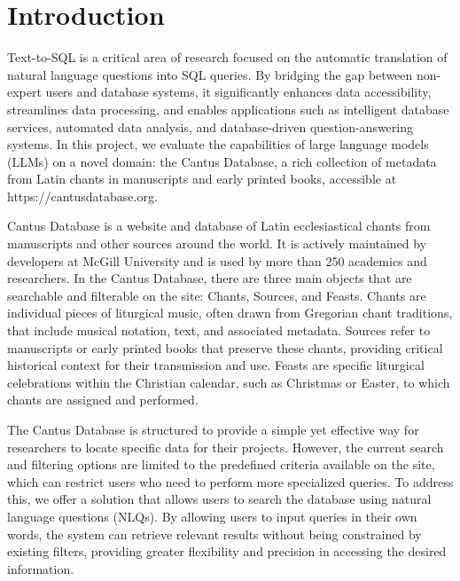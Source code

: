 \section{Introduction}


Text-to-SQL is a critical area of research focused on the automatic translation of natural language questions into SQL queries. By bridging the gap between non-expert users and database systems, it significantly enhances data accessibility, streamlines data processing, and enables applications such as intelligent database services, automated data analysis, and database-driven question-answering systems. In this project, we evaluate the capabilities of large language models (LLMs) on a novel domain: the Cantus Database, a rich collection of metadata from Latin chants in manuscripts and early printed books, accessible at https://cantusdatabase.org.

Cantus Database is a website and database of Latin ecclesiastical chants from manuscripts and other sources around the world. It is actively maintained by developers at McGill University and is used by more than 250 academics and researchers. In the Cantus Database, there are three main objects that are searchable and filterable on the site: Chants, Sources, and Feasts. Chants are individual pieces of liturgical music, often drawn from Gregorian chant traditions, that include musical notation, text, and associated metadata. Sources refer to manuscripts or early printed books that preserve these chants, providing critical historical context for their transmission and use. Feasts are specific liturgical celebrations within the Christian calendar, such as Christmas or Easter, to which chants are assigned and performed.

The Cantus Database is structured to provide a simple yet effective way for researchers to locate specific data for their projects. However, the current search and filtering options are limited to the predefined criteria available on the site, which can restrict users who need to perform more specialized queries. To address this, we offer a solution that allows users to search the database using natural language questions (NLQs). By allowing users to input queries in their own words, the system can retrieve relevant results without being constrained by existing filters, providing greater flexibility and precision in accessing the desired information.


